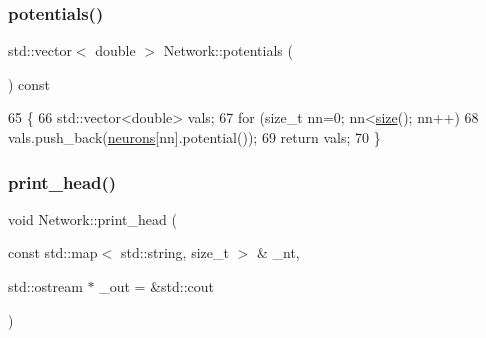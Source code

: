 \subsubsection{\texorpdfstring{potentials()}{potentials()}}
{\footnotesize\ttfamily std\+::vector$<$ double $>$ Network\+::potentials (\begin{DoxyParamCaption}{ }\end{DoxyParamCaption}) const}


\begin{DoxyCode}
65                                             \{
66     std::vector<double> vals;
67     \textcolor{keywordflow}{for} (\textcolor{keywordtype}{size\_t} nn=0; nn<\hyperlink{classNetwork_a41c54d12d861883170b5c5abca3a7bc8}{size}(); nn++)
68         vals.push\_back(\hyperlink{classNetwork_a1b7832bc2c7b8855cdc3b2d6329eff9d}{neurons}[nn].potential());
69     \textcolor{keywordflow}{return} vals;
70 \}
\end{DoxyCode}
\mbox{\label{classNetwork_ab572dd33cb91d9f0aae89c4477809d26}} 
\subsubsection{\texorpdfstring{print\+\_\+head()}{print\_head()}}
{\footnotesize\ttfamily void Network\+::print\+\_\+head (\begin{DoxyParamCaption}\item[{const std\+::map$<$ std\+::string, size\+\_\+t $>$ \&}]{\+\_\+nt,  }\item[{std\+::ostream $\ast$}]{\+\_\+out = {\ttfamily \&std\+:\+:cout} }\end{DoxyParamCaption})}


